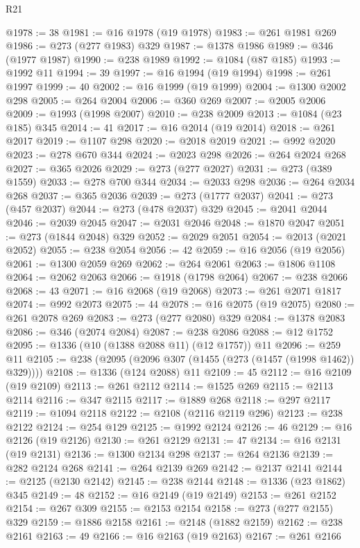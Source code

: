 \begin{lexlean}{R21}
\begin{coremodule}
{{{{{{{{{{{{{{{{{{{@1978 := 38
@1981 := @16 @1978 (@19 @1978)
@1983 := @261 @1981 @269
@1986 := @273 (@277 @1983) @329
@1987 := @1378 @1986
@1989 := @346 (@1977 @1987)
@1990 := @238 @1989
@1992 := @1084 (@87 @185)
@1993 := @1992 @11
@1994 := 39
@1997 := @16 @1994 (@19 @1994)
@1998 := @261 @1997
@1999 := 40
@2002 := @16 @1999 (@19 @1999)
@2004 := @1300 @2002 @298
@2005 := @264 @2004
@2006 := @360 @269
@2007 := @2005 @2006
@2009 := @1993 (@1998 @2007)
@2010 := @238 @2009
@2013 := @1084 (@23 @185) @345
@2014 := 41
@2017 := @16 @2014 (@19 @2014)
@2018 := @261 @2017
@2019 := @1107 @298
@2020 := @2018 @2019
@2021 := @992 @2020
@2023 := @278 @670 @344
@2024 := @2023 @298
@2026 := @264 @2024 @268
@2027 := @365 @2026
@2029 := @273 (@277 @2027)
@2031 := @273 (@389 @1559)
@2033 := @278 @700 @344
@2034 := @2033 @298
@2036 := @264 @2034 @268
@2037 := @365 @2036
@2039 := @273 (@1777 @2037)
@2041 := @273 (@457 @2037)
@2044 := @273 (@478 @2037) @329
@2045 := @2041 @2044
@2046 := @2039 @2045
@2047 := @2031 @2046
@2048 := @1870 @2047
@2051 := @273 (@1844 @2048) @329
@2052 := @2029 @2051
@2054 := @2013 (@2021 @2052)
@2055 := @238 @2054
@2056 := 42
@2059 := @16 @2056 (@19 @2056)
@2061 := @1300 @2059 @269
@2062 := @264 @2061
@2063 := @1806 @1108
@2064 := @2062 @2063
@2066 := @1918 (@1798 @2064)
@2067 := @238 @2066
@2068 := 43
@2071 := @16 @2068 (@19 @2068)
@2073 := @261 @2071 @1817
@2074 := @992 @2073
@2075 := 44
@2078 := @16 @2075 (@19 @2075)
@2080 := @261 @2078 @269
@2083 := @273 (@277 @2080) @329
@2084 := @1378 @2083
@2086 := @346 (@2074 @2084)
@2087 := @238 @2086
@2088 := @12 @1752
@2095 := @1336 (@10 (@1388 @2088 @11) (@12 @1757)) @11
@2096 := @259 @11
@2105 := @238 (@2095 (@2096 @307 (@1455 (@273 (@1457 (@1998 @1462)) @329))))
@2108 := @1336 (@124 @2088) @11
@2109 := 45
@2112 := @16 @2109 (@19 @2109)
@2113 := @261 @2112
@2114 := @1525 @269
@2115 := @2113 @2114
@2116 := @347 @2115
@2117 := @1889 @268
@2118 := @297 @2117
@2119 := @1094 @2118
@2122 := @2108 (@2116 @2119 @296)
@2123 := @238 @2122
@2124 := @254 @129
@2125 := @1992 @2124
@2126 := 46
@2129 := @16 @2126 (@19 @2126)
@2130 := @261 @2129
@2131 := 47
@2134 := @16 @2131 (@19 @2131)
@2136 := @1300 @2134 @298
@2137 := @264 @2136
@2139 := @282 @2124 @268
@2141 := @264 @2139 @269
@2142 := @2137 @2141
@2144 := @2125 (@2130 @2142)
@2145 := @238 @2144
@2148 := @1336 (@23 @1862) @345
@2149 := 48
@2152 := @16 @2149 (@19 @2149)
@2153 := @261 @2152
@2154 := @267 @309
@2155 := @2153 @2154
@2158 := @273 (@277 @2155) @329
@2159 := @1886 @2158
@2161 := @2148 (@1882 @2159)
@2162 := @238 @2161
@2163 := 49
@2166 := @16 @2163 (@19 @2163)
@2167 := @261 @2166
}}}}}}}}}}}}}}}}}}}
\end{coremodule}
\end{lexlean}
